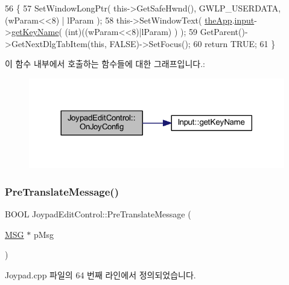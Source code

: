\begin{DoxyCode}
56 \{
57     SetWindowLongPtr( this->GetSafeHwnd(), GWLP\_USERDATA, (wParam<<8) | lParam );
58     this->SetWindowText( \mbox{\hyperlink{_v_b_a_8cpp_a8095a9d06b37a7efe3723f3218ad8fb3}{theApp}}.\mbox{\hyperlink{class_v_b_a_aaab971cb5d67a69e1a26502d15a4dc60}{input}}->\mbox{\hyperlink{class_input_a2c4ec8a744b040657e220480987cd8bf}{getKeyName}}( (\textcolor{keywordtype}{int})((wParam<<8)|lParam) ) );
59     GetParent()->GetNextDlgTabItem(\textcolor{keyword}{this}, FALSE)->SetFocus();
60     \textcolor{keywordflow}{return} TRUE;
61 \}
\end{DoxyCode}
이 함수 내부에서 호출하는 함수들에 대한 그래프입니다.\+:
\nopagebreak
\begin{figure}[H]
\begin{center}
\leavevmode
\includegraphics[width=317pt]{class_joypad_edit_control_a26c5c6132fe22f6947adc741c930504e_cgraph}
\end{center}
\end{figure}
\mbox{\label{class_joypad_edit_control_abeca620abd7b0118c1d044f9480bbede}} 
\subsubsection{\texorpdfstring{Pre\+Translate\+Message()}{PreTranslateMessage()}}
{\footnotesize\ttfamily B\+O\+OL Joypad\+Edit\+Control\+::\+Pre\+Translate\+Message (\begin{DoxyParamCaption}\item[{\mbox{\hyperlink{prof_8cpp_a0c719c414608ef14852670b063876c07}{M\+SG}} $\ast$}]{p\+Msg }\end{DoxyParamCaption})\hspace{0.3cm}{\ttfamily [virtual]}}



Joypad.\+cpp 파일의 64 번째 라인에서 정의되었습니다.


